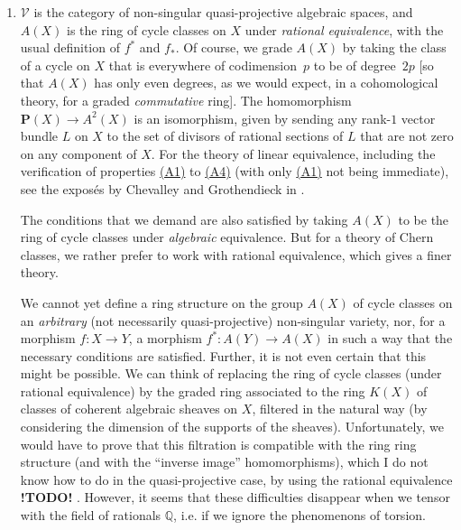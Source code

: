 \documentclass{article}
\theoremstyle{plain}
\theoremstyle{definition}
\newcommand{\cat}{\mathcal}
\newcommand{\PP}{\mathbf{P}}
\newcommand{\todo}{\textbf{ !TODO! }}
\newcommand{\oldpage}[1]{\marginpar{\footnotesize$\Big\vert$ \textit{p.~#1}}}
\begin{document}
\begin{enumerate}
  \item
    $\cat{V}$ is the category of non-singular quasi-projective algebraic spaces, and $A(X)$ is the ring of cycle classes on $X$ under \emph{rational equivalence}, with the usual definition of $f^*$ and $f_*$.
    Of course, we grade $A(X)$ by taking the class of a cycle on $X$ that is everywhere of codimension~$p$ to be of degree~$2p$ [so that $A(X)$ has only even degrees, as we would expect, in a cohomological theory, for a graded \emph{commutative} ring].
    The homomorphism $\PP(X)\to A^2(X)$ is an isomorphism, given by sending any rank-$1$ vector bundle $L$ on $X$ to the set of divisors of rational sections of $L$ that are not zero on any component of $X$.
    For the theory of linear equivalence, including the verification of properties \hyperref[axiomA1]{(A1)} to \hyperref[axiomA4]{(A4)} (with only \hyperref[axiomA1]{(A1)} not being immediate), see the expos\'{e}s by Chevalley and Grothendieck in \cite{4}.

    The conditions that we demand are also satisfied by taking $A(X)$ to be the ring of cycle classes under \emph{algebraic} equivalence.
    But for a theory
\oldpage{143}
    of Chern classes, we rather prefer to work with rational equivalence, which gives a finer theory.

    We cannot yet define a ring structure on the group $A(X)$ of cycle classes on an \emph{arbitrary} (not necessarily quasi-projective) non-singular variety, nor, for a morphism $f\colon X\to Y$, a morphism $f^*\colon A(Y)\to A(X)$ in such a way that the necessary conditions are satisfied.
    Further, it is not even certain that this might be possible.
    We can think of replacing the ring of cycle classes (under rational equivalence) by the graded ring associated to the ring $K(X)$ of classes of coherent algebraic sheaves on $X$, filtered in the natural way (by considering the dimension of the supports of the sheaves).
    Unfortunately, we would have to prove that this filtration is compatible with the ring ring structure (and with the ``inverse image'' homomorphisms), which I do not know how to do in the quasi-projective case, by using the rational equivalence\todo.
    However, it seems that these difficulties disappear when we tensor with the field of rationals $\mathbb{Q}$, i.e. if we ignore the phenomenons of torsion.


\end{enumerate}
\end{document}
